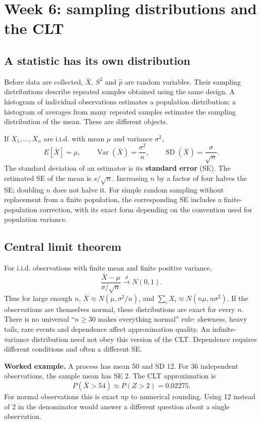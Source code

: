\clearpage
\section{Week 6: sampling distributions and the CLT}
\subsection{A statistic has its own distribution}
Before data are collected, $\bar X$, $S^2$ and $\hat p$ are random variables.
Their sampling distributions describe repeated samples obtained using the
same design. A histogram of individual observations estimates a population
distribution; a histogram of averages from many repeated samples estimates
the sampling distribution of the mean. These are different objects.

If $X_1,\ldots,X_n$ are i.i.d. with mean $\mu$ and variance $\sigma^2$,
\[
E[\bar X]=\mu,\qquad \operatorname{Var}(\bar X)=\frac{\sigma^2}{n},
\qquad \operatorname{SD}(\bar X)=\frac{\sigma}{\sqrt n}.
\]
The standard deviation of an estimator is its \textbf{standard error} (SE).
The estimated SE of the mean is $s/\sqrt n$. Increasing $n$ by a factor of
four halves the SE; doubling $n$ does not halve it. For simple random
sampling without replacement from a finite population, the corresponding
SE includes a finite-population correction, with its exact form depending
on the convention used for population variance.

\subsection{Central limit theorem}
For i.i.d. observations with finite mean and finite positive variance,
\[
\frac{\bar X-\mu}{\sigma/\sqrt n}
\xrightarrow{d}N(0,1).
\]
Thus for large enough $n$, $\bar X\approx N(\mu,\sigma^2/n)$, and
$\sum_i X_i\approx N(n\mu,n\sigma^2)$. If the observations are themselves
normal, these distributions are exact for every $n$.
There is no universal ``$n\geq30$ makes everything normal'' rule: skewness,
heavy tails, rare events and dependence affect approximation quality.
An infinite-variance distribution need not obey this version of the CLT.
Dependence requires different conditions and often a different SE.

\textbf{Worked example.} A process has mean 50 and SD 12. For 36 independent
observations, the sample mean has SE 2. The CLT approximation is
\[
P(\bar X>54)\approx P(Z>2)=0.02275.
\]
For normal observations this is exact up to numerical rounding. Using 12
instead of 2 in the denominator would answer a different question about a
single observation.

